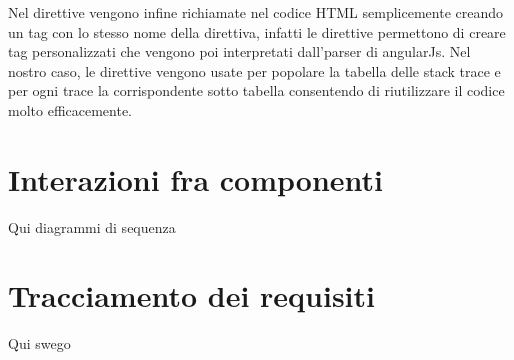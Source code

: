 Nel direttive vengono infine richiamate nel codice HTML semplicemente creando un
tag con lo stesso nome della direttiva, infatti le direttive permettono di creare
tag personalizzati che vengono poi interpretati dall'parser di angularJs.
Nel nostro caso, le direttive vengono usate per popolare la tabella delle stack trace
e per ogni trace la corrispondente sotto tabella consentendo di riutilizzare il codice
molto efficacemente.



\section{Interazioni fra componenti}
\label{sec:Interazioni}
Qui diagrammi di sequenza

\section{Tracciamento dei requisiti}
\label{sec:Tracciamento}
Qui swego 
